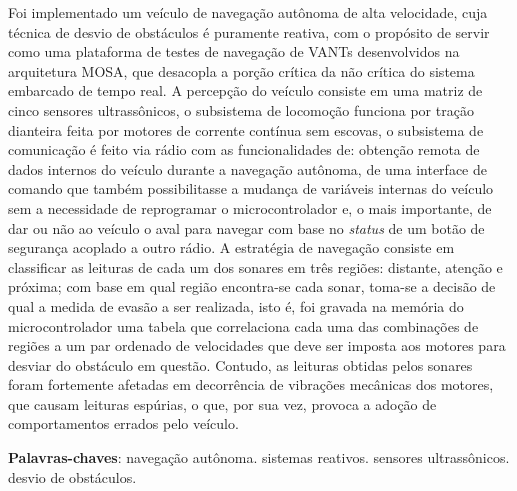 
\setlength{\absparsep}{18pt} %
\begin{resumo}
Foi implementado um veículo de navegação autônoma de alta velocidade, cuja técnica de desvio de obstáculos é puramente reativa, com o propósito de 
servir como uma plataforma de testes de navegação de VANTs desenvolvidos na arquitetura MOSA, que desacopla a porção crítica da não crítica do 
sistema embarcado de tempo real.
A percepção do veículo consiste em uma matriz de cinco sensores ultrassônicos, o subsistema de locomoção funciona por tração dianteira feita por 
motores de corrente contínua sem escovas, o subsistema de comunicação é feito via rádio com as funcionalidades de: obtenção remota de dados 
internos do veículo durante a navegação autônoma, de uma interface de comando que também possibilitasse a mudança de variáveis internas do veículo sem 
a necessidade de reprogramar o microcontrolador e, o mais importante, de dar ou não ao veículo o aval para navegar com base no \textit{status} de um 
botão de segurança acoplado a outro rádio.
A estratégia de navegação consiste em classificar as leituras de cada um dos sonares em três regiões: distante, atenção e próxima; com base em qual 
região encontra-se cada sonar, toma-se a decisão de qual a medida de evasão a ser realizada, isto é, foi gravada na memória do microcontrolador uma 
tabela que correlaciona cada uma das combinações de regiões a um par ordenado de velocidades que deve ser imposta aos motores para desviar do 
obstáculo em questão.
Contudo, as leituras obtidas pelos sonares foram fortemente afetadas em decorrência de vibrações mecânicas dos motores, que causam leituras 
espúrias, o que, por sua vez, provoca a adoção de comportamentos errados pelo veículo.

 \textbf{Palavras-chaves}: navegação autônoma. sistemas reativos. sensores ultrassônicos. desvio de obstáculos.
\end{resumo}
